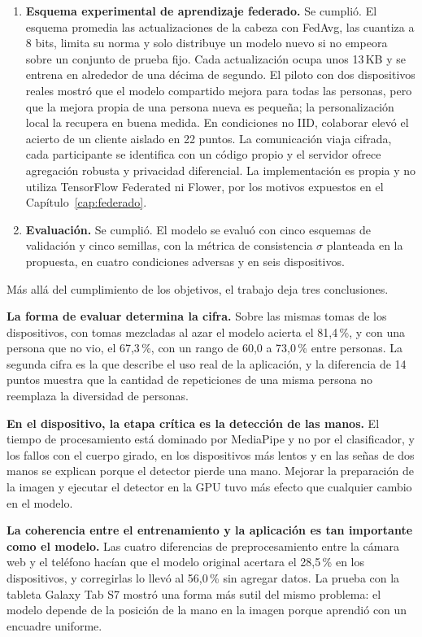 \begin{enumerate}
    \item \textbf{Esquema experimental de aprendizaje federado.} Se cumplió. El esquema promedia las actualizaciones de la cabeza con FedAvg, las cuantiza a 8 bits, limita su norma y solo distribuye un modelo nuevo si no empeora sobre un conjunto de prueba fijo. Cada actualización ocupa unos 13\,KB y se entrena en alrededor de una décima de segundo. El piloto con dos dispositivos reales mostró que el modelo compartido mejora para todas las personas, pero que la mejora propia de una persona nueva es pequeña; la personalización local la recupera en buena medida. En condiciones no IID, colaborar elevó el acierto de un cliente aislado en 22 puntos. La comunicación viaja cifrada, cada participante se identifica con un código propio y el servidor ofrece agregación robusta y privacidad diferencial. La implementación es propia y no utiliza TensorFlow Federated ni Flower, por los motivos expuestos en el Capítulo~\ref{cap:federado}.

    \item \textbf{Evaluación.} Se cumplió. El modelo se evaluó con cinco esquemas de validación y cinco semillas, con la métrica de consistencia $\sigma$ planteada en la propuesta, en cuatro condiciones adversas y en seis dispositivos.
\end{enumerate}

Más allá del cumplimiento de los objetivos, el trabajo deja tres conclusiones.

\textbf{La forma de evaluar determina la cifra.} Sobre las mismas tomas de los dispositivos, con tomas mezcladas al azar el modelo acierta el 81,4\,\%, y con una persona que no vio, el 67,3\,\%, con un rango de 60,0 a 73,0\,\% entre personas. La segunda cifra es la que describe el uso real de la aplicación, y la diferencia de 14 puntos muestra que la cantidad de repeticiones de una misma persona no reemplaza la diversidad de personas.

\textbf{En el dispositivo, la etapa crítica es la detección de las manos.} El tiempo de procesamiento está dominado por MediaPipe y no por el clasificador, y los fallos con el cuerpo girado, en los dispositivos más lentos y en las señas de dos manos se explican porque el detector pierde una mano. Mejorar la preparación de la imagen y ejecutar el detector en la GPU tuvo más efecto que cualquier cambio en el modelo.

\textbf{La coherencia entre el entrenamiento y la aplicación es tan importante como el modelo.} Las cuatro diferencias de preprocesamiento entre la cámara web y el teléfono hacían que el modelo original acertara el 28,5\,\% en los dispositivos, y corregirlas lo llevó al 56,0\,\% sin agregar datos. La prueba con la tableta Galaxy Tab S7 mostró una forma más sutil del mismo problema: el modelo depende de la posición de la mano en la imagen porque aprendió con un encuadre uniforme.

